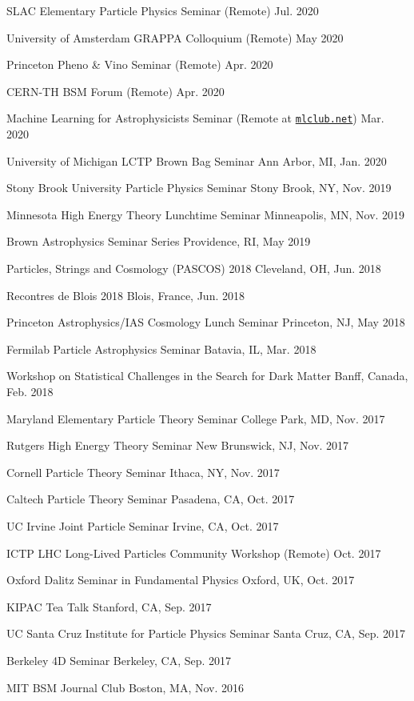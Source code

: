 \documentclass[letterpaper,11pt]{article}
\newenvironment{packed_itemize}{
\begin{itemize}[label=\raisebox{0.25ex}{\tiny$\bullet$}]
  \setlength{\itemsep}{4.2pt}
  \setlength{\parskip}{0pt}
  \setlength{\parsep}{0pt}}{\end{itemize}
}
\begin{document}
\begin{packed_itemize}
  \item SLAC Elementary Particle Physics Seminar (Remote) \hfill Jul. 2020
  \item University of Amsterdam GRAPPA Colloquium (Remote) \hfill May 2020
  \item Princeton Pheno \& Vino Seminar (Remote) \hfill Apr. 2020
  \item CERN-TH BSM Forum (Remote) \hfill  Apr. 2020
  \item Machine Learning for Astrophysicists Seminar (Remote at \href{https://docs.google.com/document/d/1GGtE-YIuAWlmpKSr38_kyiF-Fklszhkh4FkiYWzBAho/pub}{\texttt{mlclub.net}}) \hfill  Mar. 2020
  \item University of Michigan LCTP Brown Bag Seminar \hfill Ann Arbor, MI, Jan. 2020
  \item Stony Brook University Particle Physics Seminar \hfill Stony Brook, NY, Nov. 2019
  \item Minnesota High Energy Theory Lunchtime Seminar \hfill  Minneapolis, MN, Nov. 2019
  \item Brown Astrophysics Seminar Series \hfill Providence, RI, May 2019
  \item Particles, Strings and Cosmology (PASCOS) 2018 \hfill Cleveland, OH, Jun. 2018
  \item Recontres de Blois 2018 \hfill Blois, France, Jun. 2018
  \item Princeton Astrophysics/IAS Cosmology Lunch Seminar \hfill Princeton, NJ, May 2018
  \item Fermilab Particle Astrophysics Seminar \hfill Batavia, IL, Mar. 2018
  \item Workshop on Statistical Challenges in the Search for Dark Matter \hfill Banff, Canada, Feb. 2018
  \item Maryland Elementary Particle Theory Seminar \hfill College Park, MD, Nov. 2017
  \item Rutgers High Energy Theory Seminar \hfill New Brunswick, NJ, Nov. 2017
  \item Cornell Particle Theory Seminar \hfill Ithaca, NY, Nov. 2017
  \item Caltech Particle Theory Seminar \hfill Pasadena, CA, Oct. 2017
  \item UC Irvine Joint Particle Seminar \hfill Irvine, CA, Oct. 2017
  \item ICTP LHC Long-Lived Particles Community Workshop (Remote) \hfill Oct. 2017
  \item Oxford Dalitz Seminar in Fundamental Physics  \hfill Oxford, UK, Oct. 2017
  \item KIPAC Tea Talk  \hfill Stanford, CA, Sep. 2017
  \item UC Santa Cruz Institute for Particle Physics Seminar  \hfill Santa Cruz, CA, Sep. 2017
  \item Berkeley 4D Seminar  \hfill Berkeley, CA, Sep. 2017
  \item MIT BSM Journal Club \hfill Boston, MA, Nov. 2016
\end{packed_itemize}
\end{document}

